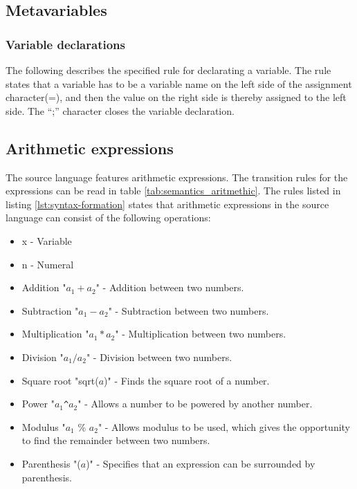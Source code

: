 \subsection{Metavariables}

\subsubsection{Variable declarations}\label{sec:analysis:syntax-definition:variable-declaration}
The following describes the specified rule for declarating a variable. The rule states that a variable has to be a variable name on the left side of the assignment character(=), and then the value on the right side is thereby assigned to the left side. The ``;'' character closes the variable declaration.

\subsection{Arithmetic expressions}
The source language features arithmetic expressions. The transition rules for the expressions can be read in table \ref{tab:semantics_aritmethic}.
The rules listed in listing \ref{lst:syntax-formation} states that arithmetic expressions in the source language can consist of the following operations:
\begin{itemize}
	\item x - Variable
	\item n - Numeral
	\item Addition "$a_1 + a_2$" - Addition between two numbers.
	\item Subtraction "$a_1 - a_2$" - Subtraction between two numbers.
	\item Multiplication "$a_1 * a_2$" - Multiplication between two numbers.
	\item Division "$a_1 / a_2$" - Division between two numbers.
	\item Square root "sqrt($a$)" - Finds the square root of a number.
	\item Power "$a_1$\texttt{\^{}}$a_2$" - Allows a number to be powered by another number.
	\item Modulus "$a_1$ \% $a_2$" - Allows modulus to be used, which gives the opportunity to find the remainder between two numbers.
	\item Parenthesis "($a$)" - Specifies that an expression can be surrounded by parenthesis.
\end{itemize}

